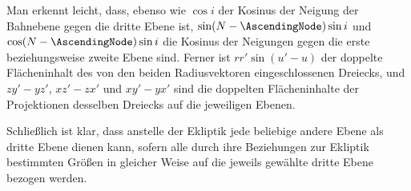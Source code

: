 Man erkennt leicht, dass, ebenso wie $\cos i$ der Kosinus der Neigung der Bahnebene gegen die dritte Ebene ist, $\sin(N-\AscendingNode)\sin i$ und $\cos(N-\AscendingNode)\sin i$ die Kosinus der Neigungen gegen die erste beziehungsweise zweite Ebene sind. Ferner ist $rr'\sin(u'-u)$ der doppelte Flächeninhalt des von den beiden Radiusvektoren eingeschlossenen Dreiecks, und $zy'-yz'$, $xz'-zx'$ und $xy'-yx'$ sind die doppelten Flächeninhalte der Projektionen desselben Dreiecks auf die jeweiligen Ebenen.

Schließlich ist klar, dass anstelle der Ekliptik jede beliebige andere Ebene als dritte Ebene dienen kann, sofern alle durch ihre Beziehungen zur Ekliptik bestimmten Größen in gleicher Weise auf die jeweils gewählte dritte Ebene bezogen werden.
